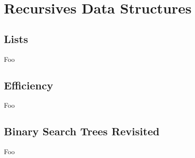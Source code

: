 \section{Recursives Data Structures}

\subsection{Lists}

Foo

\subsection{Efficiency}

Foo

\subsection{Binary Search Trees Revisited}

Foo

